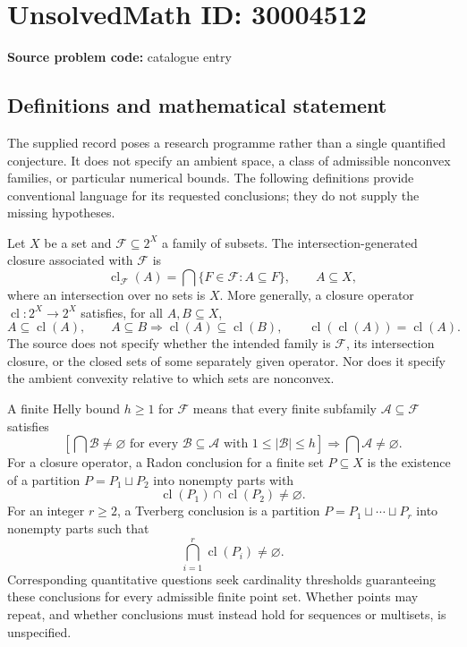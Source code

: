 \documentclass[11pt]{article}
\begin{document}
\section*{UnsolvedMath ID: 30004512}
\textbf{Source problem code:} catalogue entry
\subsection{Definitions and mathematical statement}
The supplied record poses a research programme rather than a single quantified conjecture. It does not specify an ambient space, a class of admissible nonconvex families, or particular numerical bounds. The following definitions provide conventional language for its requested conclusions; they do not supply the missing hypotheses.

Let \(X\) be a set and \(\mathcal F\subseteq 2^X\) a family of subsets. The intersection-generated closure associated with \(\mathcal F\) is
\[
\operatorname{cl}_{\mathcal F}(A)=\bigcap\{F\in\mathcal F:A\subseteq F\},\qquad A\subseteq X,
\]
where an intersection over no sets is \(X\). More generally, a closure operator \(\operatorname{cl}:2^X\to2^X\) satisfies, for all \(A,B\subseteq X\),
\[
A\subseteq\operatorname{cl}(A),\qquad
A\subseteq B\Longrightarrow\operatorname{cl}(A)\subseteq\operatorname{cl}(B),\qquad
\operatorname{cl}(\operatorname{cl}(A))=\operatorname{cl}(A).
\]
The source does not specify whether the intended family is \(\mathcal F\), its intersection closure, or the closed sets of some separately given operator. Nor does it specify the ambient convexity relative to which sets are nonconvex.

A finite Helly bound \(h\geq1\) for \(\mathcal F\) means that every finite subfamily \(\mathcal A\subseteq\mathcal F\) satisfies
\[
\left[\bigcap\mathcal B\ne\varnothing\text{ for every }\mathcal B\subseteq\mathcal A\text{ with }1\leq|\mathcal B|\leq h\right]
\Longrightarrow\bigcap\mathcal A\ne\varnothing.
\]
For a closure operator, a Radon conclusion for a finite set \(P\subseteq X\) is the existence of a partition \(P=P_1\sqcup P_2\) into nonempty parts with
\[
\operatorname{cl}(P_1)\cap\operatorname{cl}(P_2)\ne\varnothing.
\]
For an integer \(r\geq2\), a Tverberg conclusion is a partition \(P=P_1\sqcup\cdots\sqcup P_r\) into nonempty parts such that
\[
\bigcap_{i=1}^{r}\operatorname{cl}(P_i)\ne\varnothing.
\]
Corresponding quantitative questions seek cardinality thresholds guaranteeing these conclusions for every admissible finite point set. Whether points may repeat, and whether conclusions must instead hold for sequences or multisets, is unspecified.
\end{document}
